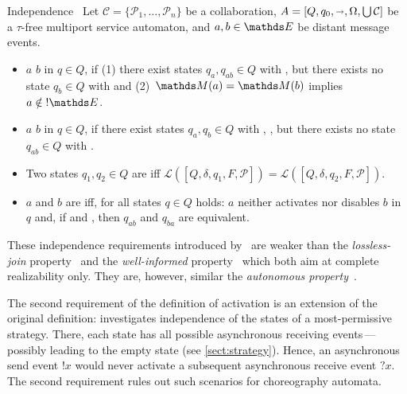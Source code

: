 \begin{definition}{Independence~\cite{Wolf_2008_topnoc}}%
Let $\mathcal{C}=\{\mathcal{P}_{1},\ldots,\mathcal{P}_{n}\}$ be a collaboration, $A=[Q,q_{0},{\shortrightarrow},\Omega,\bigcup\mathcal{C}]$ be a $\tau$-free multiport service automaton, and $a,b\in \E$ be distant message events.
\begin{itemize}
\item $a$  $b$ in $q\in Q$, if (1) there exist states $q_{a},q_{ab}\in Q$ with , but there exists no state $q_{b}\in Q$ with  and (2)~$\M(a)=\M(b)$ implies $a\notin {!\E}$.

\item $a$  $b$ in $q\in Q$, if there exist states $q_{a},q_{b}\in Q$ with , , but there exists no state $q_{ab}\in Q$ with .

\item Two states $q_{1},q_{2}\in Q$ are  iff $\mathcal{L}([Q,\delta,q_{1},F,\mathcal{P}])=\mathcal{L}([Q,\delta,q_{2},F,\mathcal{P}])$.

\item $a$ and $b$ are  iff, for all states $q\in Q$ holds: $a$ neither activates nor disables $b$ in $q$ and, if  and , then $q_{ab}$ and $q_{ba}$ are equivalent.
\end{itemize}\label{def:independence}%
\end{definition}

These independence requirements introduced by~\citet{Wolf_2008_topnoc} are weaker than the \emph{lossless-join} property~\cite{FuBS_2004_tcs} and the \emph{well-informed} property~\cite{BultanF_2008_soca} which both aim at complete realizability only. They are, however, similar the \emph{autonomous property}~\cite{FuBS_2004_tcs}.

The second requirement of the definition of activation is an extension of the original definition: \citet{Wolf_2008_topnoc} investigates independence of the states of a most-permissive strategy. There, each state has all possible asynchronous receiving events\,---\,possibly leading to the empty state (see \autoref{sect:strategy}). Hence, an asynchronous send event $!{x}$ would never activate a subsequent asynchronous receive event $?{x}$. The second requirement rules out such scenarios for choreography automata.

